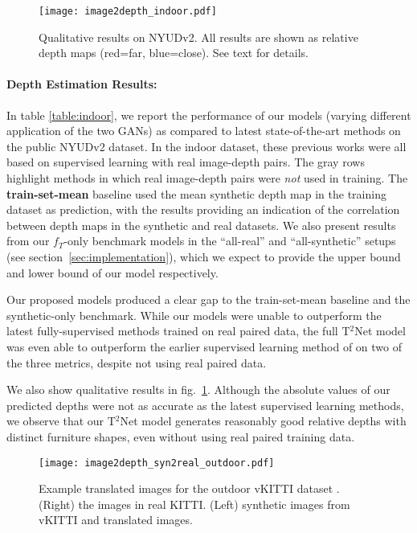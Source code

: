 \documentclass[runningheads]{llncs}
\begin{document}
\begin{figure}[tb!]
	\centering
	\texttt{[image: image2depth\_indoor.pdf]}
	\caption{Qualitative results on NYUDv2. All results are shown as relative depth maps (red=far, blue=close). See text for details. }
	\label{fig:depth_indoor}
\end{figure}

\paragraph{\bf Depth Estimation Results:} In table \ref{table:indoor}, we report the performance of our models (varying different application of the two GANs) as compared to latest state-of-the-art methods on the public NYUDv2 dataset. In the indoor dataset, these previous works were all based on supervised learning with real image-depth pairs. The gray rows highlight methods in which real image-depth pairs were \emph{not} used in training. The {\bf train-set-mean} baseline used the mean synthetic depth map in the training dataset as prediction, with the results providing an indication of the correlation between depth maps in the synthetic and real datasets.
We also present results from our $f_T$-only benchmark models in the ``all-real'' and ``all-synthetic'' setups (see section~\ref{sec:implementation}), which we expect to provide the upper bound and lower bound of our model respectively.

Our proposed models produced a clear gap to the train-set-mean baseline and the synthetic-only benchmark. While our models were unable to outperform the latest fully-supervised methods trained on real paired data, the full T$^2$Net model was even able to outperform the earlier supervised learning method of \cite{ladicky2014pulling} on two of the three metrics, despite not using real paired data.

We also show qualitative results in fig.~\ref{fig:depth_indoor}. Although the absolute values of our predicted depths were not as accurate as the latest supervised learning methods, we observe that our T$^2$Net model generates reasonably good relative depths with distinct furniture shapes, even without using real paired training data. 


\begin{figure}[tb!]
	\centering
	\texttt{[image: image2depth\_syn2real\_outdoor.pdf]}
	\caption{Example translated images for the outdoor vKITTI dataset \cite{gaidon2016virtualworlds}. (Right) the images in real KITTI. (Left) synthetic images from vKITTI and translated images.}
	\label{fig:syn2real_kitti}
\end{figure}
\end{document}

